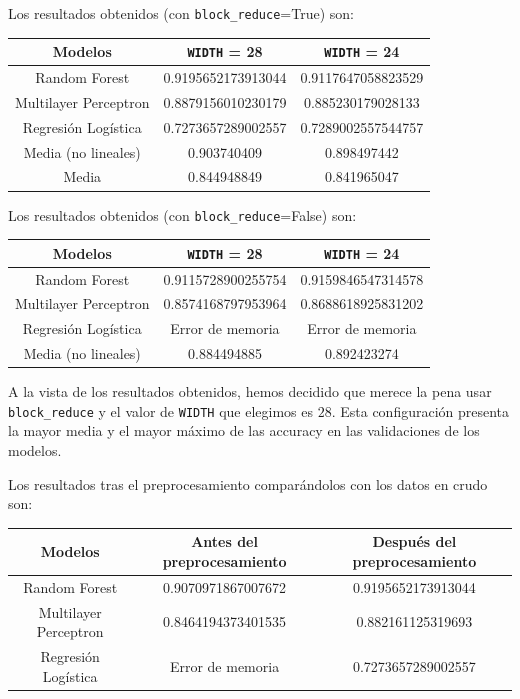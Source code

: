 \documentclass[a4]{article}
\begin{document}
Los resultados obtenidos (con \texttt{block\_reduce}=True) son:

\begin{center}
\begin{tabular}{|c|c|c|}
\hline
\multicolumn{1}{|c|}{Modelos}& \textbf{\texttt{WIDTH} = 28} &
\textbf{\texttt{WIDTH} = 24}  \\ \hline
  Random Forest         & 0.9195652173913044 & 0.9117647058823529 \\
  Multilayer Perceptron & 0.8879156010230179 & 0.885230179028133 \\
  Regresión Logística   & 0.7273657289002557 & 0.7289002557544757 \\
  Media (no lineales) & 0.903740409 & 0.898497442 \\
  Media & 0.844948849 & 0.841965047 \\ \hline
\end{tabular}
\end{center}

Los resultados obtenidos (con \texttt{block\_reduce}=False) son:

\begin{center}
\begin{tabular}{|c|c|c|}
\hline
\multicolumn{1}{|c|}{Modelos}& \textbf{\texttt{WIDTH} = 28} &
\textbf{\texttt{WIDTH} = 24}  \\ \hline
  Random Forest         & 0.9115728900255754 & 0.9159846547314578 \\
  Multilayer Perceptron & 0.8574168797953964 & 0.8688618925831202 \\
  Regresión Logística   & Error de memoria   & Error de memoria \\
  Media (no lineales) & 0.884494885 & 0.892423274 \\ \hline
\end{tabular}
\end{center}

A la vista de los resultados obtenidos, hemos decidido que merece la
pena usar \texttt{block\_reduce} y el valor de \texttt{WIDTH} que
elegimos es $28$. Esta configuración presenta la mayor media y el
mayor máximo de las accuracy en las validaciones de los modelos.

Los resultados tras el preprocesamiento comparándolos con los datos en
crudo son:
\begin{center}
\begin{tabular}{|c|c|c|}
  \hline
  \multicolumn{1}{|c|}{Modelos}& \textbf{Antes del preprocesamiento} &
                                                                       \textbf{Después del preprocesamiento}  \\ \hline
  Random Forest         & 0.9070971867007672 & 0.9195652173913044 \\
  Multilayer Perceptron & 0.8464194373401535 & 0.882161125319693 \\
  Regresión Logística   & Error de memoria   & 0.7273657289002557 \\ \hline
\end{tabular}
\end{center}
\end{document}
